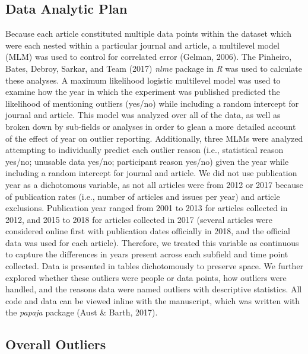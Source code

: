 \documentclass[english,,man]{apa6}
\begin{document}
\hypertarget{data-analytic-plan}{%
\subsection{Data Analytic Plan}\label{data-analytic-plan}}

Because each article constituted multiple data points within the dataset which were each nested within a particular journal and article, a multilevel model (MLM) was used to control for correlated error (Gelman, 2006). The Pinheiro, Bates, Debroy, Sarkar, and Team (2017) \emph{nlme} package in \emph{R} was used to calculate these analyses. A maximum likelihood logistic multilevel model was used to examine how the year in which the experiment was published predicted the likelihood of mentioning outliers (yes/no) while including a random intercept for journal and article. This model was analyzed over all of the data, as well as broken down by sub-fields or analyses in order to glean a more detailed account of the effect of year on outlier reporting. Additionally, three MLMs were analyzed attempting to individually predict each outlier reason (i.e., statistical reason yes/no; unusable data yes/no; participant reason yes/no) given the year while including a random intercept for journal and article. We did not use publication year as a dichotomous variable, as not all articles were from 2012 or 2017 because of publication rates (i.e., number of articles and issues per year) and article exclusions. Publication year ranged from 2001 to 2013 for articles collected in 2012, and 2015 to 2018 for articles collected in 2017 (several articles were considered online first with publication dates officially in 2018, and the official data was used for each article). Therefore, we treated this variable as continuous to capture the differences in years present across each subfield and time point collected. Data is presented in tables dichotomously to preserve space. We further explored whether these outliers were people or data points, how outliers were handled, and the reasons data were named outliers with descriptive statistics. All code and data can be viewed inline with the manuscript, which was written with the \emph{papaja} package (Aust \& Barth, 2017).

\hypertarget{overall-outliers}{%
\subsection{Overall Outliers}\label{overall-outliers}}
\end{document}
